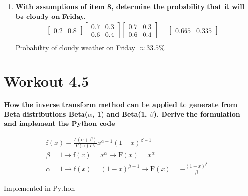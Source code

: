 \documentclass[a4paper]{article}
\begin{document}
\begin{enumerate}
	\item \textbf{ With assumptions of item 8, determine the probability that it will be cloudy on Friday.
	} \\
	\begin{equation}
	\begin{aligned}
	\begin{bmatrix} 0.2& 0.8 \end{bmatrix}
		\begin{bmatrix} 0.7& 0.3 \\ 0.6& 0.4 \end{bmatrix}\begin{bmatrix} 0.7& 0.3 \\ 0.6& 0.4 \end{bmatrix} = \begin{bmatrix} 0.665& 0.335 \end{bmatrix} \\
	\end{aligned}
	\end{equation}
	Probability of cloudy weather on Friday $\approx 33.5\%$ 


\end{enumerate}

\newpage

\section*{Workout 4.5}
\textbf{How the inverse transform method can be applied to generate from Beta distributions Beta($\alpha$, 1) and Beta(1, $\beta$). Derive the formulation and implement the Python code}

\begin{equation}
\begin{aligned}
\text{f}(x) = \frac{\Gamma(\alpha+\beta)} {\Gamma(\alpha)\Gamma{\beta}}x^{\alpha-1}(1-x)^{\beta-1} \\
\beta = 1 \rightarrow \text{f}(x) = x^{\alpha}  \rightarrow \text{F}(x) = x^{\alpha}\\
\alpha = 1 \rightarrow \text{f}(x) = (1-x)^{\beta-1} \rightarrow \text{F}(x) = -\frac{(1-x)^{\beta}} {\beta} 
\end{aligned}
\end{equation}

Implemented in Python
\end{document}

